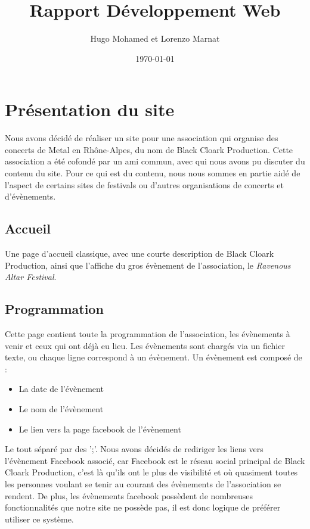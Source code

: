 \documentclass[a4paper, 12pt]{article}
\title{Rapport Développement Web}
\author{Hugo Mohamed et Lorenzo Marnat}
\date{\today}
\begin{document}
\maketitle

\newpage

\tableofcontents

\newpage

\section{Présentation du site}
Nous avons décidé de réaliser un site pour une association qui organise des concerts de Metal en Rhône-Alpes, du nom de Black Cloark Production. Cette association a été cofondé par un ami commun, avec qui nous avons pu discuter du contenu du site.
Pour ce qui est du contenu, nous nous sommes en partie aidé de l'aspect de certains sites de festivals ou d'autres organisations de concerts et d'évènements.

\subsection{Accueil}
Une page d'accueil classique, avec une courte description de Black Cloark Production, ainsi que l'affiche du gros évènement de l'association, le \textit{Ravenous Altar Festival}.

\subsection{Programmation}
Cette page contient toute la programmation de l'association, les évènements à venir et ceux qui ont déjà eu lieu. Les évènements sont chargés via un fichier texte, ou chaque ligne correspond à un évènement. Un évènement est composé de :
\begin{itemize}
\item La date de l'évènement
\item Le nom de l'évènement
\item Le lien vers la page facebook de l'évènement
\end{itemize}
Le tout séparé par des ';'.
Nous avons décidés de rediriger les liens vers l'évènement Facebook associé, car Facebook est le réseau social principal de Black Cloark Production, c'est là qu'ils ont le plus de visibilité et où quasiment toutes les personnes voulant se tenir au courant des évènements de l'association se rendent. De plus, les évènements facebook possèdent de nombreuses fonctionnalités que notre site ne possède pas, il est donc logique de préférer utiliser ce système.
\end{document}
